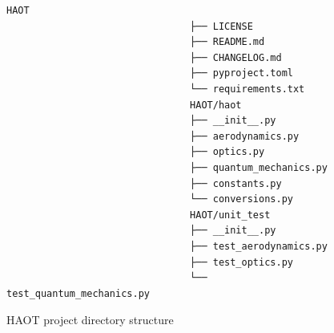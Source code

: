 \begin{figure}[H]
    \centering
    \begin{lstlisting}[style=tree]
                                HAOT
                                ├── LICENSE
                                ├── README.md
                                ├── CHANGELOG.md 
                                ├── pyproject.toml
                                └── requirements.txt 
                                HAOT/haot
                                ├── __init__.py
                                ├── aerodynamics.py
                                ├── optics.py
                                ├── quantum_mechanics.py 
                                ├── constants.py
                                └── conversions.py 
                                HAOT/unit_test
                                ├── __init__.py
                                ├── test_aerodynamics.py
                                ├── test_optics.py
                                └── test_quantum_mechanics.py
                                    \end{lstlisting}
    \caption{\gls{HAOT} project directory structure}
    \label{fig:haotStructure}
\end{figure}
